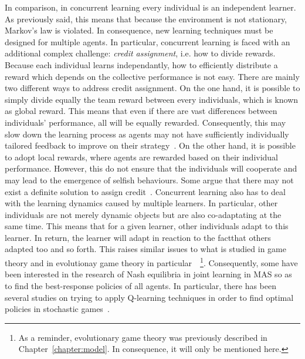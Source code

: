   In comparison, in concurrent learning every individual is an independent learner. As previously said, this means that because the environment is not stationary, Markov's law is violated. In consequence, new learning techniques must be designed for multiple agents. In particular, concurrent learning is faced with an additional complex challenge: \emph{credit assignment}, i.e. how to divide rewards. Because each individual learns independantly, how to efficiently distribute a reward which depends on the collective performance is not easy. There are mainly two different ways to address credit assignment. On the one hand, it is possible to simply divide equally the team reward between every individuals, which is known as global reward. This means that even if there are vast differences between individuals' performance, all will be equally rewarded. Consequently, this may slow down the learning process as agents may not have sufficiently individually tailored feedback to improve on their strategy~\parencite{Wolpert2001}. On the other hand, it is possible to adopt local rewards, where agents are rewarded based on their individual performance. However, this do not ensure that the individuals will cooperate and may lead to the emergence of selfish behaviours. Some argue that there may not exist a definite solution to assign credit~\parencite{Balch1999}. Concurrent learning also has to deal with the learning dynamics caused by multiple learners. In particular, other individuals are not merely dynamic objects but are also co-adaptating at the same time. This means that for a given learner, other individuals adapt to this learner. In return, the learner will adapt in reaction to the factthat others adapted too and so forth. This raises similar issues to what is studied in game theory and in evolutionay game theory in particular~\parencite{MaynardSmith1973, Fudenberg1998, Bloembergen2015}~\footnote{As a reminder, evolutionary game theory was previously described in Chapter~\ref{chapter:model}. In consequence, it will only be mentioned here.}. Consequently, some have been interested in the research of Nash equilibria in joint learning in MAS so as to find the best-response policies of all agents. In particular, there has been several studies on trying to apply Q-learning techniques in order to find optimal policies in stochastic games~\parencite{Littman1994, Claus1998, Bowling2003, Greenwald2005, Kapetanakis2005}.

